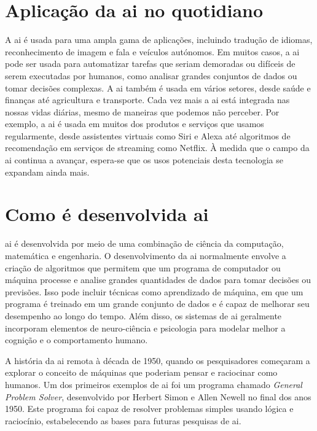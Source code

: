 \documentclass{report}
\begin{document}
\section{Aplicação da \ac{ai} no quotidiano}

A \ac{ai} é usada para uma ampla gama de aplicações, incluindo tradução de idiomas, reconhecimento de imagem e fala e veículos autónomos. Em muitos casos, a \ac{ai} pode ser usada para automatizar tarefas que seriam demoradas ou difíceis de serem executadas por humanos, como analisar grandes conjuntos de dados ou tomar decisões complexas. A \ac{ai} também é usada em vários setores, desde saúde e finanças até agricultura e transporte.
Cada vez mais a \ac{ai} está integrada nas nossas vidas diárias, mesmo de maneiras que podemos não perceber. Por exemplo, a \ac{ai} é usada em muitos dos produtos e serviços que usamos regularmente, desde assistentes virtuais como Siri e Alexa até algoritmos de recomendação em serviços de streaming como Netflix.
À medida que o campo da \ac{ai} continua a avançar, espera-se que os usos potenciais desta tecnologia se expandam ainda mais.



\section{Como é desenvolvida \ac{ai}}

\ac{ai} é desenvolvida por meio de uma combinação de ciência da computação, matemática e engenharia. O desenvolvimento da \ac{ai} normalmente envolve a criação de algoritmos que permitem que um programa de computador ou máquina processe e analise grandes quantidades de dados para tomar decisões ou previsões. Isso pode incluir técnicas como aprendizado de máquina, em que um programa é treinado em um grande conjunto de dados e é capaz de melhorar seu desempenho ao longo do tempo. Além disso, os sistemas de \ac{ai} geralmente incorporam elementos de neuro-ciência e psicologia para modelar melhor a cognição e o comportamento humano.

A história da \ac{ai} remota à década de 1950, quando os pesquisadores começaram a explorar o conceito de máquinas que poderiam pensar e raciocinar como humanos. Um dos primeiros exemplos de \ac{ai} foi um programa chamado \textit{General Problem Solver}, desenvolvido por Herbert Simon e Allen Newell no final dos anos 1950. Este programa foi capaz de resolver problemas simples usando lógica e raciocínio, estabelecendo as bases para futuras pesquisas de \ac{ai}.
\end{document}
